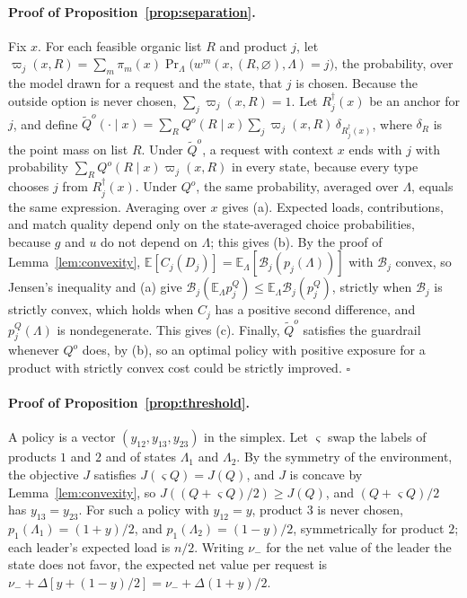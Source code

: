 \documentclass[opre,dblanonrev]{informs4}
\providecommand{\E}{\mathbb{E}}
\providecommand{\1}{\mathbf{1}}
\begin{document}
\begin{APPENDICES}
\paragraph{Proof of Proposition~\ref{prop:separation}.}
Fix $x$. For each feasible organic list $R$ and product $j$, let $\varpi_j(x,R)=\sum_m\pi_m(x)\Pr_\Lambda\bigl(w^m(x,(R,\varnothing),\Lambda)=j\bigr)$, the probability, over the model drawn for a request and the state, that $j$ is chosen. Because the outside option is never chosen, $\sum_j\varpi_j(x,R)=1$. Let $R_j^\dagger(x)$ be an anchor for $j$, and define $\tilde Q^o(\cdot\mid x)=\sum_RQ^o(R\mid x)\sum_j\varpi_j(x,R)\,\delta_{R_j^\dagger(x)}$, where $\delta_{R}$ is the point mass on list $R$. Under $\tilde Q^o$, a request with context $x$ ends with $j$ with probability $\sum_RQ^o(R\mid x)\varpi_j(x,R)$ in every state, because every type chooses $j$ from $R_j^\dagger(x)$. Under $Q^o$, the same probability, averaged over $\Lambda$, equals the same expression. Averaging over $x$ gives (a). Expected loads, contributions, and match quality depend only on the state-averaged choice probabilities, because $g$ and $u$ do not depend on $\Lambda$; this gives (b). By the proof of Lemma~\ref{lem:convexity}, $\E[C_j(D_j)]=\E_\Lambda[\mathcal B_j(p_j(\Lambda))]$ with $\mathcal B_j$ convex, so Jensen's inequality and (a) give $\mathcal B_j(\E_\Lambda p_j^Q)\le\E_\Lambda\mathcal B_j(p_j^Q)$, strictly when $\mathcal B_j$ is strictly convex, which holds when $C_j$ has a positive second difference, and $p_j^Q(\Lambda)$ is nondegenerate. This gives (c). Finally, $\tilde Q^o$ satisfies the guardrail whenever $Q^o$ does, by (b), so an optimal policy with positive exposure for a product with strictly convex cost could be strictly improved. \hfill$\square$

\paragraph{Proof of Proposition~\ref{prop:threshold}.}
A policy is a vector $(y_{12},y_{13},y_{23})$ in the simplex. Let $\varsigma$ swap the labels of products $1$ and $2$ and of states $\Lambda_1$ and $\Lambda_2$. By the symmetry of the environment, the objective $J$ satisfies $J(\varsigma Q)=J(Q)$, and $J$ is concave by Lemma~\ref{lem:convexity}, so $J((Q+\varsigma Q)/2)\ge J(Q)$, and $(Q+\varsigma Q)/2$ has $y_{13}=y_{23}$. For such a policy with $y_{12}=y$, product $3$ is never chosen, $p_1(\Lambda_1)=(1+y)/2$, and $p_1(\Lambda_2)=(1-y)/2$, symmetrically for product $2$; each leader's expected load is $n/2$. Writing $\nu_-$ for the net value of the leader the state does not favor, the expected net value per request is $\nu_-+\Delta[y+(1-y)/2]=\nu_-+\Delta(1+y)/2$.


\end{APPENDICES}
\end{document}
